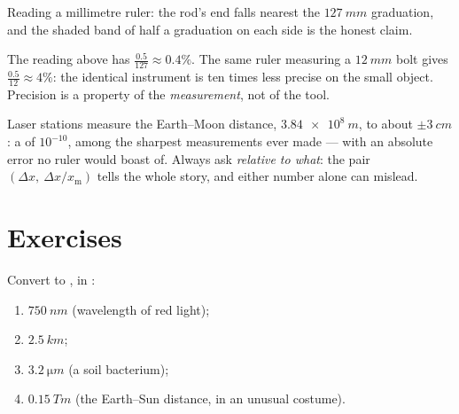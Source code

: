 \begin{omfigure}

{\small Reading a millimetre ruler: the rod's end falls nearest the
$\qty{127}{mm}$ graduation, and the shaded band of half a graduation
on each side is the honest claim.}
\end{omfigure}

\begin{example}\label{ex:g10:orders-of-magnitude:reading}
The reading above has 
$\frac{0.5}{127} \approx 0.4\%$. The same ruler measuring a
$\qty{12}{mm}$ bolt gives $\frac{0.5}{12} \approx 4\%$: the identical
instrument is ten times less precise on the small object. Precision is
a property of the \emph{measurement}, not of the tool.
\end{example}

\begin{remark}\label{rem:g10:orders-of-magnitude:precision}
Laser stations measure the Earth--Moon distance, $\qty{3.84e8}{m}$, to
about $\pm\qty{3}{cm}$: a  of $10^{-10}$, among
the sharpest measurements ever made --- with an absolute error no
ruler would boast of. Always ask \emph{relative to what}: the pair
$(\Delta x,\ \Delta x / x_{\text{m}})$ tells the whole story, and
either number alone can mislead.
\end{remark}

\section{Exercises}

\begin{exercise}[$\star$]\label{exo:g10:orders-of-magnitude:1}
Convert to , in :
\begin{enumerate}
  \item $\qty{750}{nm}$ (wavelength of red light);
  \item $\qty{2.5}{km}$;
  \item $\qty{3.2}{\micro m}$ (a soil bacterium);
  \item $\qty{0.15}{Tm}$ (the Earth--Sun distance, in an unusual
        costume).
\end{enumerate}
\end{exercise}

